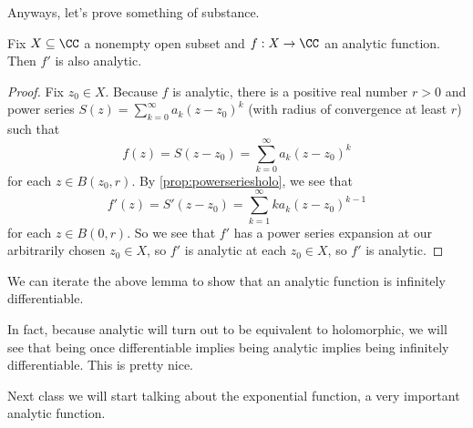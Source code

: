 Anyways, let's prove something of substance.
\begin{lemma} \label{lem:ddzanaisana}
	Fix $X\subseteq\CC$ a nonempty open subset and $f:X\to\CC$ an analytic function. Then $f'$ is also analytic.
\end{lemma}
\begin{proof}
	Fix $z_0\in X$. Because $f$ is analytic, there is a positive real number $r>0$ and power series $S(z)=\sum_{k=0}^\infty a_k(z-z_0)^k$ (with radius of convergence at least $r$) such that
	\[f(z)=S(z-z_0)=\sum_{k=0}^\infty a_k(z-z_0)^k\]
	for each $z\in B(z_0,r)$. By \autoref{prop:powerseriesholo}, we see that
	\[f'(z)=S'(z-z_0)=\sum_{k=1}^\infty ka_k(z-z_0)^{k-1}\]
	for each $z\in B(0,r)$. So we see that $f'$ has a power series expansion at our arbitrarily chosen $z_0\in X$, so $f'$ is analytic at each $z_0\in X$, so $f'$ is analytic.
\end{proof}
\begin{remark}
	We can iterate the above lemma to show that an analytic function is infinitely differentiable.
\end{remark}
\begin{remark}
	In fact, because analytic will turn out to be equivalent to holomorphic, we will see that being once differentiable implies being analytic implies being infinitely differentiable. This is pretty nice.
\end{remark}
Next class we will start talking about the exponential function, a very important analytic function.